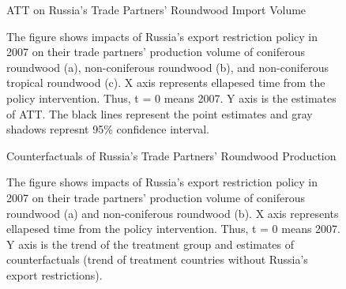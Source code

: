 \documentclass[a4paper,12pt]{article}
\begin{document}
\begin{figure}[htbp] 
    \centering
    \caption{ATT on Russia's Trade Partners' Roundwood Import Volume}
    \caption*{\small{The figure shows impacts of Russia's export restriction policy in 2007 on their trade partners' production volume of coniferous roundwood (a), non-coniferous roundwood (b), and non-coniferous tropical roundwood (c). X axis represents ellapesed time from the policy intervention. Thus, t = 0 means 2007. Y axis is the estimates of ATT. The black lines represent the point estimates and gray shadows represnt 95\% confidence interval.}}
    \label{fig:att_imp_Russia}
\end{figure}


\begin{figure}[htbp] 
    \centering
    \caption{Counterfactuals of Russia's Trade Partners' Roundwood Production}
    \caption*{\small{The figure shows impacts of Russia's export restriction policy in 2007 on their trade partners' production volume of coniferous roundwood (a) and non-coniferous roundwood (b). X axis represents ellapesed time from the policy intervention. Thus, t = 0 means 2007. Y axis is the trend of the treatment group and estimates of counterfactuals (trend of treatment countries without Russia's export restrictions).}}
    \label{fig:cf_prod_Russia}
\end{figure}
\end{document}
